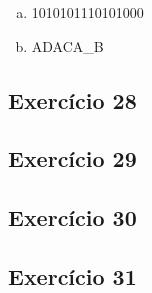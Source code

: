 \begin{enumerate}[a)]
    \item 1010101110101000
    \item ADACA\_B
\end{enumerate}


\subsection{Exercício 28}\label{sec:exer28}

\subsection{Exercício 29}\label{sec:exer29}

\subsection{Exercício 30}\label{sec:exer30}

\subsection{Exercício 31}\label{sec:exer31}
